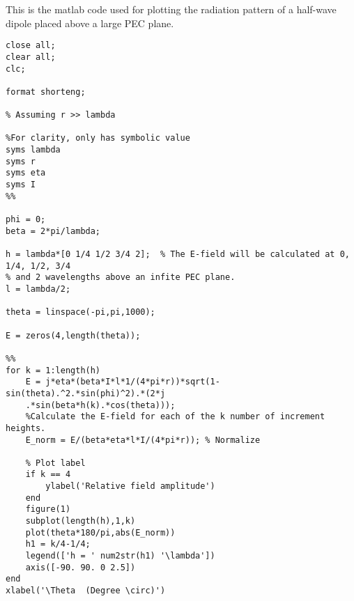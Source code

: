 \label{app:rasmusmatlab}

This is the matlab code used for plotting the radiation pattern of a half-wave dipole placed above a large PEC plane.

\begin{lstlisting}
close all;
clear all;
clc;

format shorteng;

% Assuming r >> lambda

%For clarity, only has symbolic value
syms lambda
syms r
syms eta
syms I 
%%

phi = 0;
beta = 2*pi/lambda;

h = lambda*[0 1/4 1/2 3/4 2];  % The E-field will be calculated at 0, 1/4, 1/2, 3/4
% and 2 wavelengths above an infite PEC plane.
l = lambda/2;

theta = linspace(-pi,pi,1000);

E = zeros(4,length(theta));

%%
for k = 1:length(h)
    E = j*eta*(beta*I*l*1/(4*pi*r))*sqrt(1-sin(theta).^2.*sin(phi)^2).*(2*j
    .*sin(beta*h(k).*cos(theta))); 
    %Calculate the E-field for each of the k number of increment heights.
    E_norm = E/(beta*eta*l*I/(4*pi*r)); % Normalize
    
    % Plot label
    if k == 4
        ylabel('Relative field amplitude')
    end
    figure(1)
    subplot(length(h),1,k)
    plot(theta*180/pi,abs(E_norm))
    h1 = k/4-1/4;
    legend(['h = ' num2str(h1) '\lambda'])
    axis([-90. 90. 0 2.5])
end
xlabel('\Theta  (Degree \circ)')

\end{lstlisting}